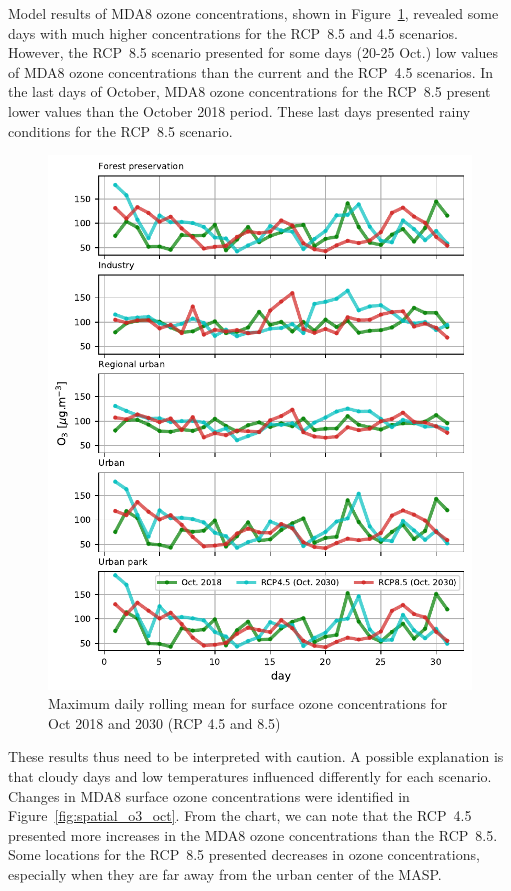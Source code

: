 Model results of MDA8 ozone concentrations, shown in Figure~\ref{fig:MDA8_rcp_oct}, revealed some days with much higher concentrations for the RCP~8.5 and 4.5 scenarios.
However, the RCP~8.5 scenario presented for some days (20-25 Oct.) low values of MDA8 ozone concentrations than the current and the RCP~4.5 scenarios.
In the last days of October, MDA8 ozone concentrations for the RCP~8.5 present lower values than the October 2018 period.
These last days presented rainy conditions for the RCP~8.5 scenario. 

\begin{figure}[!hbt]
  \begin{center}
	\includegraphics{fig/MDA8_type_rcps_oct18}
  \end{center}
  \caption{Maximum daily rolling mean for surface ozone concentrations for Oct 2018 and 2030 (RCP 4.5 and 8.5)}
  \label{fig:MDA8_rcp_oct}
\end{figure}

These results thus need to be interpreted with caution.
A possible explanation is that cloudy days and low temperatures influenced differently for each scenario.
Changes in MDA8 surface ozone concentrations were identified in Figure~\ref{fig:spatial_o3_oct}. 
From the chart, we can note that the RCP~4.5 presented more increases in the MDA8 ozone concentrations than the RCP~8.5.
Some locations for the RCP~8.5 presented decreases in ozone concentrations, especially when they are far away from the urban center of the MASP.

